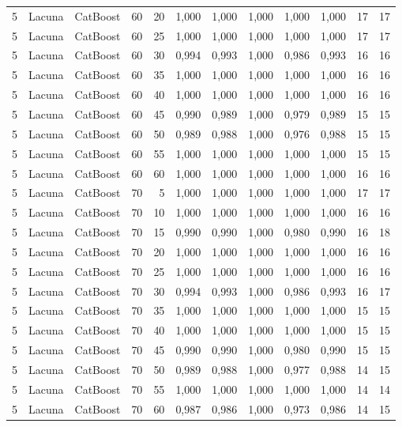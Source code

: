 \begin{longtable}{ccclrrrrrrrr}
5 & Lacuna & CatBoost & 60 & 20 & 1,000 & 1,000 & 1,000 & 1,000 & 1,000 & 17 & 17 \\
5 & Lacuna & CatBoost & 60 & 25 & 1,000 & 1,000 & 1,000 & 1,000 & 1,000 & 17 & 17 \\
5 & Lacuna & CatBoost & 60 & 30 & 0,994 & 0,993 & 1,000 & 0,986 & 0,993 & 16 & 16 \\
5 & Lacuna & CatBoost & 60 & 35 & 1,000 & 1,000 & 1,000 & 1,000 & 1,000 & 16 & 16 \\
5 & Lacuna & CatBoost & 60 & 40 & 1,000 & 1,000 & 1,000 & 1,000 & 1,000 & 16 & 16 \\
5 & Lacuna & CatBoost & 60 & 45 & 0,990 & 0,989 & 1,000 & 0,979 & 0,989 & 15 & 15 \\
5 & Lacuna & CatBoost & 60 & 50 & 0,989 & 0,988 & 1,000 & 0,976 & 0,988 & 15 & 15 \\
5 & Lacuna & CatBoost & 60 & 55 & 1,000 & 1,000 & 1,000 & 1,000 & 1,000 & 15 & 15 \\
5 & Lacuna & CatBoost & 60 & 60 & 1,000 & 1,000 & 1,000 & 1,000 & 1,000 & 16 & 16 \\
5 & Lacuna & CatBoost & 70 & 5 & 1,000 & 1,000 & 1,000 & 1,000 & 1,000 & 17 & 17 \\
5 & Lacuna & CatBoost & 70 & 10 & 1,000 & 1,000 & 1,000 & 1,000 & 1,000 & 16 & 16 \\
5 & Lacuna & CatBoost & 70 & 15 & 0,990 & 0,990 & 1,000 & 0,980 & 0,990 & 16 & 18 \\
5 & Lacuna & CatBoost & 70 & 20 & 1,000 & 1,000 & 1,000 & 1,000 & 1,000 & 16 & 16 \\
5 & Lacuna & CatBoost & 70 & 25 & 1,000 & 1,000 & 1,000 & 1,000 & 1,000 & 16 & 16 \\
5 & Lacuna & CatBoost & 70 & 30 & 0,994 & 0,993 & 1,000 & 0,986 & 0,993 & 16 & 17 \\
5 & Lacuna & CatBoost & 70 & 35 & 1,000 & 1,000 & 1,000 & 1,000 & 1,000 & 15 & 15 \\
5 & Lacuna & CatBoost & 70 & 40 & 1,000 & 1,000 & 1,000 & 1,000 & 1,000 & 15 & 15 \\
5 & Lacuna & CatBoost & 70 & 45 & 0,990 & 0,990 & 1,000 & 0,980 & 0,990 & 15 & 15 \\
5 & Lacuna & CatBoost & 70 & 50 & 0,989 & 0,988 & 1,000 & 0,977 & 0,988 & 14 & 15 \\
5 & Lacuna & CatBoost & 70 & 55 & 1,000 & 1,000 & 1,000 & 1,000 & 1,000 & 14 & 14 \\
5 & Lacuna & CatBoost & 70 & 60 & 0,987 & 0,986 & 1,000 & 0,973 & 0,986 & 14 & 15 \\

\end{longtable}
